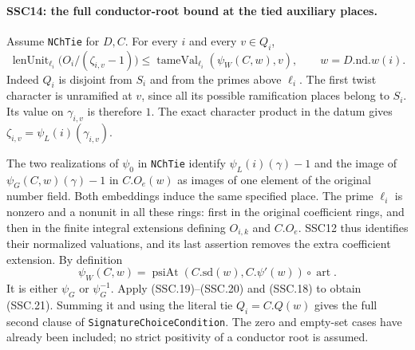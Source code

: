 \documentclass[11pt,a4paper]{article}
\numberwithin{equation}{section}
\theoremstyle{remark}\newtheorem{remark}[theorem]{Remark}
\begin{document}
\paragraph{SSC14: the full conductor-root bound at the tied auxiliary places.}
\label{claim:SSC14}
Assume \texttt{NCh\allowbreak Tie} for $D,C$. For every $i$ and every
$v\in Q_i$,
\[
 \operatorname{lenUnit}_{\ell_i}
        \bigl(O_i/(\zeta_{i,v}-1)\bigr)
  \le \operatorname{tameVal}_{\ell_i}
          (\psi_W(C,w),v),\qquad w=D.\mathrm{nd}.w(i).         \tag{SSC.21}
\]
Indeed $Q_i$ is disjoint from $S_i$ and from the primes above
$\ell_i$. The first twist character is unramified at $v$, since
all its possible ramification places belong to $S_i$. Its value
on $\gamma_{i,v}$ is therefore $1$. The exact character product
in the datum gives
$\zeta_{i,v}=\psi_L(i)(\gamma_{i,v})$.

The two realizations of $\psi_0$ in \texttt{NCh\allowbreak Tie} identify
$\psi_L(i)(\gamma)-1$ and the image of
$\psi_G(C,w)(\gamma)-1$ in $C.O_e(w)$ as images of one element
of the original number field. Both embeddings induce the same
specified place. The prime $\ell_i$ is nonzero and a nonunit in
all these rings: first in the original coefficient rings, and then
in the finite integral extensions defining $O_{i,k}$ and $C.O_e$.
SSC12 thus identifies their normalized valuations, and its last
assertion removes the extra coefficient extension. By definition
\[
 \psi_W(C,w)=\operatorname{psiAt}(C.\mathrm{sd}(w),C.\psi'(w))
                         \circ\operatorname{art}.
\]
It is either $\psi_G$ or $\psi_G^{-1}$. Apply (SSC.19)--(SSC.20)
and (SSC.18) to obtain (SSC.21). Summing it and using the literal
tie $Q_i=C.Q(w)$ gives the full second clause of
\texttt{Signature\allowbreak Choice\allowbreak Condition}. The zero and empty-set cases
have already been included; no strict positivity of a conductor
root is assumed.

\end{document}

